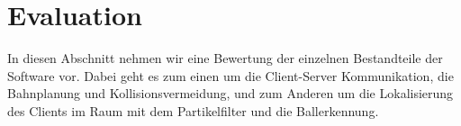 
\chapter{Evaluation}
\label{cha:evaluation}
In diesen Abschnitt nehmen wir eine Bewertung der einzelnen
Bestandteile der Software vor. Dabei geht es zum einen um die
Client-Server Kommunikation, die Bahnplanung und Kollisionsvermeidung,
und zum Anderen um die Lokalisierung des Clients im Raum mit dem
Partikelfilter und die Ballerkennung.


%
%


